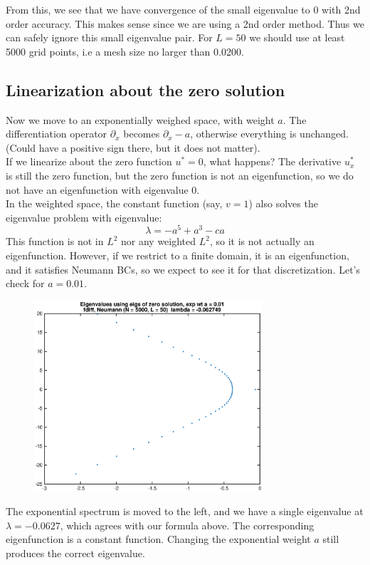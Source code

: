 \documentclass[12pt]{article}
\begin{document}
From this, we see that we have convergence of the small eigenvalue to 0 with 2nd order accuracy. This makes sense since we are using a 2nd order method. Thus we can safely ignore this small eigenvalue pair. For $L = 50$ we should use at least 5000 grid points, i.e a mesh size no larger than 0.0200.

\subsection*{Linearization about the zero solution}
Now we move to an exponentially weighed space, with weight $a$. The differentiation operator $\partial_x$ becomes $\partial_x - a$, otherwise everything is unchanged. (Could have a positive sign there, but it does not matter).\\

If we linearize about the zero function $u^* = 0$, what happens? The derivative $u^*_x$ is still the zero function, but the zero function is not an eigenfunction, so we do not have an eigenfunction with eigenvalue 0.\\

In the weighted space, the constant function (say, $v = 1$) also solves the eigenvalue problem with eigenvalue:
\[ 
\lambda = -a^5 + a^3 - c a 
\]
This function is not in $L^2$ nor any weighted $L^2$, so it is not actually an eigenfunction. However, if we restrict to a finite domain, it is an eigenfunction, and it satisfies Neumann BCs, so we expect to see it for that discretization. Let's check for $a = 0.01$.

\begin{figure}[H]
\includegraphics[width=8.5cm]{zeroeigsfdiff.eps}
\end{figure}
The exponential spectrum is moved to the left, and we have a single eigenvalue at $\lambda = -0.0627$, which agrees with our formula above. The corresponding eigenfunction is a constant function. Changing the exponential weight $a$ still produces the correct eigenvalue.\\
\end{document}
